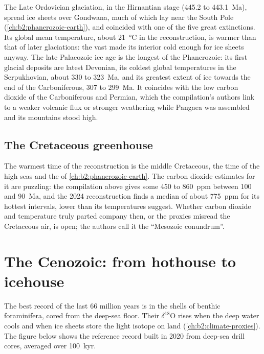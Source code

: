 The Late Ordovician glaciation, in the Hirnantian stage (445.2 to \qty{443.1}{Ma}), spread ice sheets
over Gondwana, much of which lay near the South Pole (\cref{ch:b2:phanerozoic-earth}), and
coincided with one of the five great extinctions. Its global mean temperature, about
\qty{21}{\celsius} in the reconstruction, is warmer than that of later glaciations: the vast
 made its interior cold enough for ice sheets anyway. The late Palaeozoic ice age is
the longest of the Phanerozoic: its first glacial deposits are latest Devonian, its coldest global
temperatures in the Serpukhovian, about 330 to \qty{323}{Ma}, and its greatest extent
of ice towards the end of the Carboniferous, 307 to \qty{299}{Ma}. It coincides with the low carbon
dioxide of the Carboniferous and Permian, which the compilation's authors link to a weaker volcanic
flux or stronger weathering while Pangaea was assembled and its mountains stood high.

\subsection*{The Cretaceous greenhouse}

The warmest time of the reconstruction is the middle Cretaceous, the time of the high seas and the
 of \cref{ch:b2:phanerozoic-earth}. The carbon dioxide estimates for
it are puzzling: the compilation above gives some 450 to \qty{860}{ppm} between 100 and
\qty{90}{Ma}, and the 2024 reconstruction finds a median of about \qty{775}{ppm} for its hottest
intervals, lower than its temperatures suggest. Whether carbon dioxide and temperature truly parted
company then, or the proxies misread the Cretaceous air, is open; the authors call it the ``Mesozoic
conundrum''.

\section{The Cenozoic: from hothouse to icehouse}\label{sec:b2:deep-time-climate:cenozoic}

The best record of the last 66 million years is in the shells of benthic foraminifera, cored from
the deep-sea floor. Their $\delta^{18}$O rises when the deep water cools and when ice sheets store
the light isotope on land (\cref{ch:b2:climate-proxies}). The figure below shows the reference
record built in 2020 from deep-sea drill cores, averaged over \qty{100}{kyr}.

